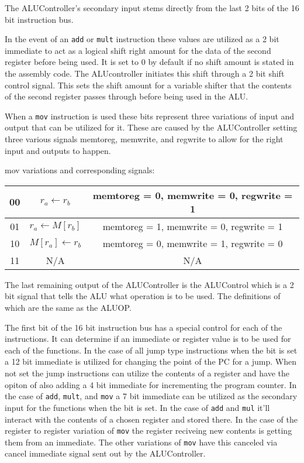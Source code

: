 \documentclass{article}
\begin{document}
The ALUController's secondary input stems directly from the last 2 bits of the
16 bit instruction bus.

In the event of an \texttt{add} or \texttt{mult} instruction these values are
utilized as a 2 bit immediate to act as a logical shift right amount for the
data of the second register before being used.  It is set to 0 by default if no
shift amount is stated in the assembly code.  The ALUcontroller initiates this
shift through a 2 bit shift control signal. This sets the shift amount for a
variable shifter that the contents of the second register passes through before
being used in the ALU.

When a \texttt{mov} instruction is used these bits represent three variations
of input and output that can be utilized for it.  These are caused by the
ALUController setting three various signals memtoreg, memwrite, and regwrite to
allow for the right input and outputs to happen.

mov variations and corresponding signals:

\begin{center}
\begin{tabular}{|c|c|c|}
\hline
00 & $r_{a} \leftarrow r_{b}$ & memtoreg = 0, memwrite = 0, regwrite = 1 \\ \hline
01 & $r_{a} \leftarrow M[r_{b}]$ & memtoreg = 1, memwrite = 0, regwrite = 1 \\ \hline
10 & $M[r_{a}] \leftarrow r_{b}$ & memtoreg = 0, memwrite = 1, regwrite = 0 \\ \hline
11 & N/A & N/A \\ \hline
\end{tabular}
\end{center}

The last remaining output of the ALUController is the ALUControl which is a 2
bit signal that tells the ALU what operation is to be used.  The definitions of
which are the same as the ALUOP.

The first bit of the 16 bit instruction bus has a special control for each of
the instructions.  It can determine if an immediate or register value is to be
used for each of the functions.  In the case of all jump type instructions when
the bit is set a 12 bit immediate is utilized for changing the point of the PC
for a jump.  When not set the jump instructions can utilize the contents of a
register and have the opiton of also adding a 4 bit immediate for incrementing
the program counter.  In the case of \texttt{add}, \texttt{mult}, and
\texttt{mov} a 7 bit immediate can be utilized  as the secondary input for the
functions when the bit is set.  In the case of \texttt{add} and \texttt{mul}
it'll interact with the contents of a chosen register and stored there. In the
case of the register to register variation of \texttt{mov} the register
reciveing new contents is getting them from an immediate.  The other variations
of \texttt{mov} have this canceled via cancel immediate signal sent out by the
ALUController.
\end{document}
